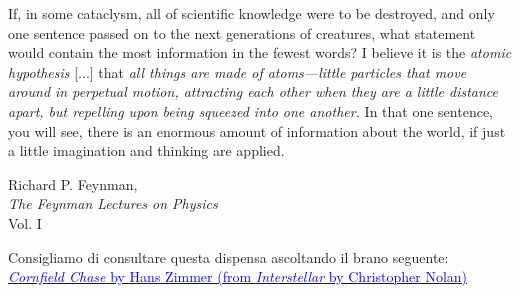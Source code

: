 \epigraph{If, in some cataclysm, all of scientific knowledge were
to be destroyed, and only one sentence passed on to the next generations
of creatures, what statement would contain the most information in the
fewest words? I believe it is the \textit{atomic hypothesis} [...]
that \textit{all things are made of atoms—little particles that move
around in perpetual motion, attracting each other when they are a little
distance apart, but repelling upon being squeezed into one another.}
In that one sentence, you will see, there is an enormous amount of
information about the world, if just a little imagination and
thinking are applied.}{Richard P. Feynman,\\\textit{The Feynman Lectures on Physics}\\Vol. I}

\vspace*{9cm}
\begin{center}
Consigliamo di consultare questa dispensa ascoltando il brano seguente:\\
\href{https://www.youtube.com/watch?v=JuSsvM8B4Jc}{\textcolor{blue}{\textit{Cornfield Chase} by Hans Zimmer (from \textit{Interstellar} by Christopher Nolan)}}
\end{center}